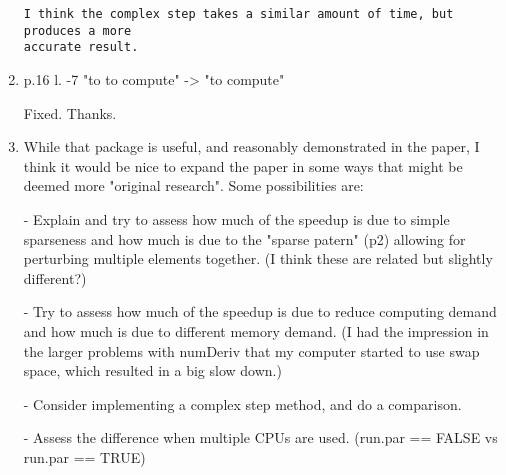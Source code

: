 \documentclass{article}
\newenvironment{revQuote}{\itshape}{\vspace{\baselineskip}}
\newenvironment{response}{\normalfont}{\vspace{\baselineskip}}
\begin{document}
\begin{enumerate}
\begin{revQuote}
\begin{verbatim}
I think the complex step takes a similar amount of time, but produces a more
accurate result.

\end{verbatim}

  \end{revQuote}
  
  \begin{response}
    
  \end{response}

\item\begin{revQuote}

 p.16  l. -7 "to to compute" -> "to compute"


  \end{revQuote}
  
  \begin{response}
    Fixed.  Thanks.
  \end{response}

\item\begin{revQuote}

While that package is useful, and reasonably demonstrated in the paper,
I think it would be nice to expand the paper in some ways that might be
deemed more "original research". Some possibilities are:

 - Explain and try to assess how much of the speedup is due to simple
sparseness and how much is due to the "sparse patern" (p2) allowing for
perturbing multiple elements together. (I think these are related but
slightly different?)
 
 - Try to assess how much of the speedup is due to reduce computing demand
and how much is due to different memory demand. (I had the impression in the
larger problems with numDeriv that my computer started to use swap space,
which resulted in a big slow down.)
 
 - Consider implementing a complex step method, and do a comparison.
 
 - Assess the difference when multiple CPUs are used. (run.par == FALSE vs
run.par == TRUE)

  \end{revQuote}
  
  \begin{response}
    
  \end{response}



  


\end{enumerate}
\end{document}

